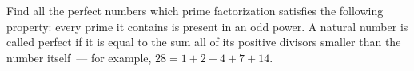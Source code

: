 \problem
Find all the perfect numbers which prime factorization satisfies the following property:
every prime it contains is present in an odd power.
A natural number is called perfect if it is equal to the sum all of its positive divisors smaller than the number itself~--- for example, $28 = 1 + 2 + 4 + 7 + 14$.
\solution
\endproblem
